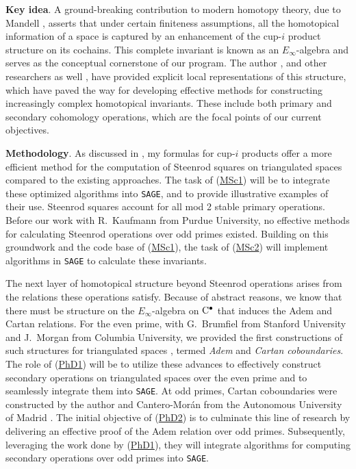 \smallskip\textbf{Key idea}.
A ground-breaking contribution to modern homotopy theory, due to Mandell \cite{mandell2006homotopy_type}, asserts that under certain finiteness assumptions, all the homotopical information of a space is captured by an enhancement of the cup-$i$ product structure on its cochains.
This complete invariant is known as an \mbox{$E_\infty$-algebra} and serves as the conceptual cornerstone of our program.
The author \cite{medina2020prop1}, and other researchers as well \cite{mcclure2003multivariable, berger2004combinatorial}, have provided explicit local representations of this structure, which have paved the way for developing effective methods for constructing increasingly complex homotopical invariants. These include both primary and secondary cohomology operations, which are the focal points of our current objectives.

\smallskip\textbf{Methodology}.
As discussed in \cite{medina2023fast_sq}, my formulas for cup-$i$ products offer a more efficient method for the computation of Steenrod squares on triangulated spaces compared to the existing approaches.
The task of (\underline{MSc1}) will be to integrate these optimized algorithms into \texttt{SAGE}, and to provide illustrative examples of their use.
Steenrod squares account for all mod 2 stable primary operations.
Before our work \cite{medina2021may_st} with R.~Kaufmann from Purdue University, no effective methods for calculating Steenrod operations over odd primes existed.
Building on this groundwork and the code base of (\underline{MSc1}), the task of (\underline{MSc2}) will implement algorithms in \texttt{SAGE} to calculate these invariants.

\quad The next layer of homotopical structure beyond Steenrod operations arises from the relations these operations satisfy.
Because of abstract reasons, we know that there must be structure on the $E_\infty$-algebra on $\mathrm{C}^\bullet$ that induces the Adem and Cartan relations.
For the even prime, with G.~Brumfiel from Stanford University and J.~Morgan from Columbia University, we provided the first constructions of such structures for triangulated spaces \cite{medina2020cartan, medina2021adem}, termed \textit{Adem} and \textit{Cartan coboundaries}.
The role of (\underline{PhD1}) will be to utilize these advances to effectively construct secondary operations on triangulated spaces over the even prime and to seamlessly integrate them into \texttt{SAGE}.
At odd primes, Cartan coboundaries were constructed by the author and Cantero-Mor\'an from the Autonomous University of Madrid \cite{medina2023oddcartan}.
The initial objective of (\underline{PhD2}) is to culminate this line of research by delivering an effective proof of the Adem relation over odd primes.
Subsequently, leveraging the work done by (\underline{PhD1}), they will integrate algorithms for computing secondary operations over odd primes into \texttt{SAGE}.

